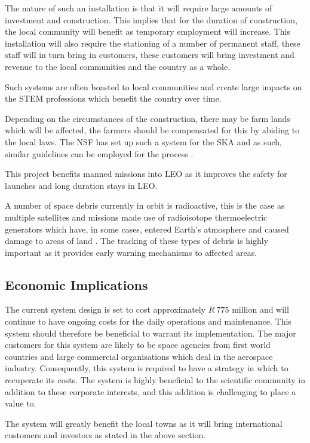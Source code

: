 \documentclass[11pt]{witseiepaper}
\begin{document}
\begin{bibunit}[witseie]
The nature of such an installation is that it will require large amounts of investment and construction. This implies that for the duration of construction, the local community will benefit as temporary employment will increase. This installation will also require the stationing of a number of permanent staff, these staff will in turn bring in customers, these customers will bring investment and revenue to the local communities and the country as a whole.

Such systems are often boasted to local communities and create large impacts on the STEM professions which benefit the country over time.

Depending on the circumstances of the construction, there may be farm lands which will be affected, the farmers should be compensated for this by abiding to the local laws. The NSF has set up such a system for the SKA and as such, similar guidelines can be employed for the process \cite{SKAActDescription}.

This project benefits manned missions into LEO as it improves the safety for launches and long duration stays in LEO.

A number of space debris currently in orbit is radioactive, this is the case as multiple satellites and missions made use of radioisotope thermoelectric generators which have, in some cases, entered Earth's atmosphere and caused damage to areas of land \cite{RTG}. The tracking of these types of debris is highly important as it provides early warning mechanisms to affected areas.


\subsection{Economic Implications} \label{sec:EconomicImplications}
The current system design is set to cost approximately $R~775$ million and will continue to have ongoing costs for the daily operations and maintenance.
This system should therefore be beneficial to warrant its implementation. The major customers for this system are likely to be space agencies from first world countries and large commercial organisations which deal in the aerospace industry.
Consequently, this system is required to have a strategy in which to recuperate its costs.
The system is highly beneficial to the scientific community in addition to these corporate interests, and this addition is challenging to place a value to.

The system will greatly benefit the local towns as it will bring international customers and investors as stated in the above section.


\end{bibunit}
\end{document}
